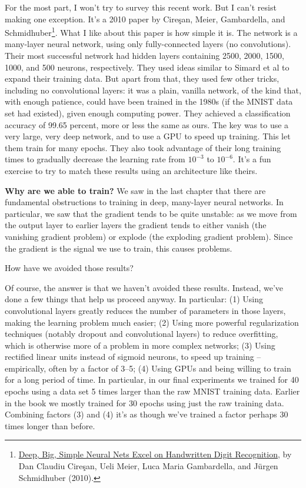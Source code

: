\documentclass[a4paper,twoside,10pt]{book}
\begin{document}
For the most part, I won't try to survey this recent work. But I can't resist making one exception. It's a 2010 paper by Cire\c{s}an, Meier, Gambardella, and Schmidhuber\footnote{\href{http://arxiv.org/abs/1003.0358}{Deep, Big, Simple Neural Nets Excel on Handwritten Digit Recognition}, by Dan Claudiu Cire\c{s}an, Ueli Meier, Luca Maria Gambardella, and J\"urgen Schmidhuber (2010).}. What I like about this paper is how simple it is. The network is a many-layer neural network, using only fully-connected layers (no convolutions). Their most successful network had hidden layers containing 2500, 2000, 1500, 1000, and 500 neurons, respectively. They used ideas similar to Simard et al to expand their training data. But apart from that, they used few other tricks, including no convolutional layers: it was a plain, vanilla network, of the kind that, with enough patience, could have been trained in the 1980s (if the MNIST data set had existed), given enough computing power. They achieved a classification accuracy of 99.65 percent, more or less the same as ours. The key was to use a very large, very deep network, and to use a GPU to speed up training. This let them train for many epochs. They also took advantage of their long training times to gradually decrease the learning rate from $10^{-3}$ to $10^{-6}$. It's a fun exercise to try to match these results using an architecture like theirs.

\textbf{Why are we able to train?} We saw in the last chapter that there are fundamental obstructions to training in deep, many-layer neural networks. In particular, we saw that the gradient tends to be quite unstable: as we move from the output layer to earlier layers the gradient tends to either vanish (the vanishing gradient problem) or explode (the exploding gradient problem). Since the gradient is the signal we use to train, this causes problems.

How have we avoided those results?

Of course, the answer is that we haven't avoided these results. Instead, we've done a few things that help us proceed anyway. In particular: (1) Using convolutional layers greatly reduces the number of parameters in those layers, making the learning problem much easier; (2) Using more powerful regularization techniques (notably dropout and convolutional layers) to reduce overfitting, which is otherwise more of a problem in more complex networks; (3) Using rectified linear units instead of sigmoid neurons, to speed up training -- empirically, often by a factor of 3--5; (4) Using GPUs and being willing to train for a long period of time. In particular, in our final experiments we trained for 40 epochs using a data set 5 times larger than the raw MNIST training data. Earlier in the book we mostly trained for 30 epochs using just the raw training data. Combining factors (3) and (4) it's as though we've trained a factor perhaps 30 times longer than before.
\end{document}
